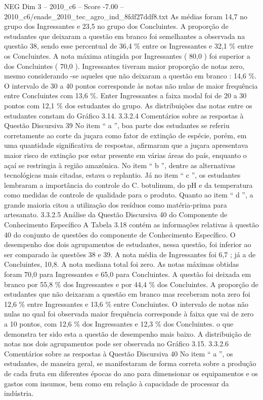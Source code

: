 \begin{textsample}{NEG Dim 3 – 2010\_c6 – Score -7.00 – 2010\_c6/enade\_2010\_tec\_agro\_ind\_8fdf27ddf8.txt}
As médias foram 14,7 no grupo dos Ingressantes e 23,5 no grupo dos Concluintes.
A proporção de estudantes que deixaram a questão em branco foi semelhantes a observada na questão 38, sendo esse percentual de 36,4 \% entre os Ingressantes e 32,1 \% entre os Concluintes.
A nota máxima atingida por Ingressantes ( 80,0 ) foi superior a dos Concluintes ( 70,0 ).
Ingressantes tiveram maior proporção de notas zero, mesmo considerando -se aqueles que não deixaram a questão em branco : 14,6 \%.
O intervalo de 30 a 40 pontos corresponde às notas não nulas de maior frequência entre Concluintes com 13,6 \%.
Enter Ingressantes a faixa modal foi de 20 a 30 pontos com 12,1 \% dos estudantes do grupo.
As distribuições das notas entre os estudantes constam do Gráfico 3.14. 3.3.2.4 Comentários sobre as respostas à Questão Discursiva 39 No item “ a ”, boa parte dos estudantes se referiu corretamente ao corte da juçara como fator de extinção de espécie, porém, em uma quantidade significativa de respostas, afirmaram que a juçara apresentava maior risco de extinção por estar presente em várias áreas do país, enquanto o açaí se restringia à região amazônica.
No item “ b ”, dentre as alternativas tecnológicas mais citadas, estava o replantio.
Já no item “ c ”, os estudantes lembraram a importância do controle do C. botulinum, do pH e da temperatura como medidas de controle de qualidade para o produto.
Quanto ao item “ d ”, a grande maioria citou a utilização dos resíduos como matéria-prima para artesanato. 3.3.2.5 Análise da Questão Discursiva 40 do Componente de Conhecimento Específico A Tabela 3.18 contém as informações relativas à questão 40 do conjunto de questões do componente de Conhecimento Específico.
O desempenho dos dois agrupamentos de estudantes, nessa questão, foi inferior ao ser comparado às questões 38 e 39.
A nota média de Ingressantes foi 6,7 ; já a de Concluintes, 10,8.
A nota mediana total foi zero.
As notas máximas obtidas foram 70,0 para Ingressantes e 65,0 para Concluintes.
A questão foi deixada em branco por 55,8 \% dos Ingressantes e por 44,4 \% dos Concluintes.
A proporção de estudantes que não deixaram a questão em branco mas receberam nota zero foi 12,6 \% entre Ingressantes e 13,6 \% entre Concluintes.
O intervalo de notas não nulas no qual foi observada maior frequência corresponde à faixa que vai de zero a 10 pontos, com 12,6 \% dos Ingressantes e 12,3 \% dos Concluintes. o que demonstra ter sido esta a questão de desempenho mais baixo.
A distribuição de notas nos dois agrupamentos pode ser observada no Gráfico 3.15. 3.3.2.6 Comentários sobre as respostas à Questão Discursiva 40 No item “ a ”, os estudantes, de maneira geral, se manifestaram de forma correta sobre a produção de cada fruta em diferentes épocas do ano para dimensionar os equipamentos e os gastos com insumos, bem como em relação à capacidade de processar da indústria.

\end{textsample}
